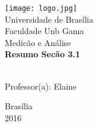 \begin{titlepage}
        \begin{center}
            \texttt{[image: logo.jpg]}\\[0.3cm]
            {\large Universidade de Brasília}\\[0.2cm]
            {\large Faculdade Unb Gama}\\[0.2cm]
            {\large Medicão e Análise}\\[4.1cm]
            {\bf \huge Resumo Secão 3.1}\\[4.1cm]
        \end{center}
        \\[0.7cm]
        {\normalsize Professor(a): Elaine}
        \vfill
        \begin{center}
            {\large Brasília}\\[0.2cm]
            {\large 2016}
        \end{center}
\end{titlepage}
